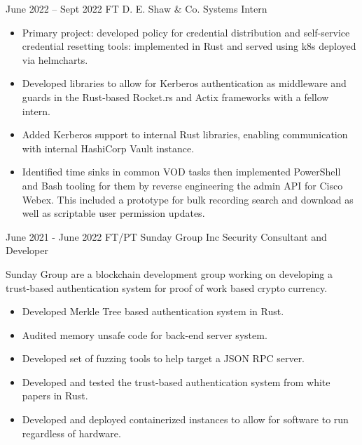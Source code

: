 \documentclass[
	9pt, %
]{FreemanCV}
\begin{document}
\begin{paracol}{2}
\jobentry
	{June 2022 -- Sept 2022} %
	{FT} %
	{D. E. Shaw \& Co.} %
	{Systems Intern} %
	{\begin{itemize}[noitemsep, topsep=0pt, partopsep=0pt, leftmargin=8pt, before =\leavevmode\vspace*{-\baselineskip}]
			\item Primary project: developed policy for credential distribution and self-service credential resetting tools: implemented in Rust and served using k8s deployed via helmcharts.
			\item Developed libraries to allow for Kerberos authentication as middleware and guards in the Rust-based Rocket.rs and Actix frameworks with a fellow intern.
			\item  Added Kerberos support to internal Rust libraries, enabling communication with internal HashiCorp Vault instance. 
			\item Identified time sinks in common VOD tasks then implemented 
			PowerShell and Bash tooling for them by reverse engineering the admin API for Cisco Webex. 
			This included a prototype for bulk recording search and download as well as scriptable user permission updates. 
	\end{itemize}} %

\jobentry
	{June 2021 - June 2022} %
	{FT/PT} %
	{Sunday Group Inc} %
	{Security Consultant and Developer} %
	{
	Sunday Group are a blockchain development group working on developing a trust-based authentication 
	system for proof of work based crypto currency. 
	\medspace

	\begin{itemize}[noitemsep, topsep=0pt, partopsep=0pt, leftmargin=8pt]
		\item	Developed Merkle Tree based authentication system in Rust.
		\item	Audited memory unsafe code for back-end server system.
		\item	Developed set of fuzzing tools to help target a JSON RPC server.
		\item	Developed and tested the trust-based authentication system from white papers in Rust.
		\item	Developed and deployed containerized instances to allow for software to run regardless of hardware. 
	\end{itemize}
	} %


\end{paracol}
\end{document}
